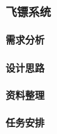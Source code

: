 \subsubsection{飞镖系统}

    \paragraph{需求分析}
    
    \paragraph{设计思路}
    
    \paragraph{资料整理}
    
    \paragraph{任务安排}
    